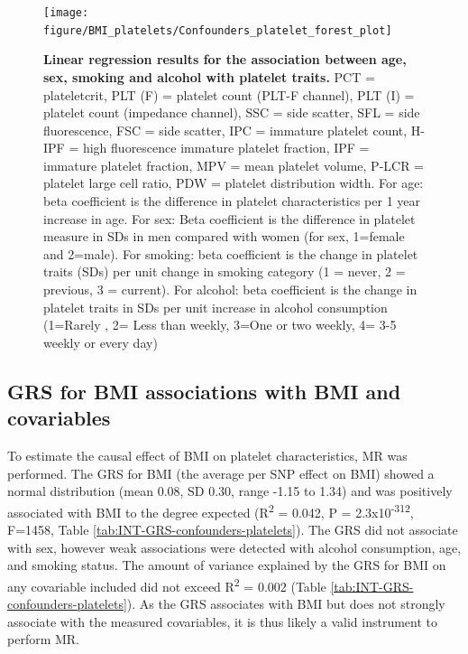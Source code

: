 \documentclass[11pt,twoside]{bristolthesis}
\begin{document}
\begin{figure}

{\centering \texttt{[image: figure/BMI\_platelets/Confounders\_platelet\_forest\_plot]} 

}

\caption[Linear regression results for the association between age, sex, smoking and alcohol with platelet traits]{\textbf{Linear regression results for the association between age, sex, smoking and alcohol with platelet traits.} PCT = plateletcrit, PLT (F) = platelet count (PLT-F channel), PLT (I) = platelet count (impedance channel), SSC = side scatter, SFL = side fluorescence, FSC = side scatter, IPC = immature platelet count, H-IPF = high fluorescence immature platelet fraction, IPF = immature platelet fraction, MPV = mean platelet volume, P-LCR = platelet large cell ratio, PDW = platelet distribution width. For age: beta coefficient is the difference in platelet characteristics per 1 year increase in age. For sex: Beta coefficient is the difference in platelet measure in SDs in men compared with women (for sex, 1=female and 2=male). For smoking: beta coefficient is the change in platelet traits (SDs) per unit change in smoking category (1 = never, 2 = previous, 3 = current). For alcohol: beta coefficient is the change in platelet traits in SDs per unit increase in alcohol consumption (1=Rarely , 2= Less than weekly, 3=One or two weekly, 4= 3-5 weekly or every day)}\label{fig:confounder-platelets}
\end{figure}
\hypertarget{grs-for-bmi-associations-with-bmi-and-covariables}{%
\subsection{GRS for BMI associations with BMI and covariables}\label{grs-for-bmi-associations-with-bmi-and-covariables}}

To estimate the causal effect of BMI on platelet characteristics, MR was performed. The GRS for BMI (the average per SNP effect on BMI) showed a normal distribution (mean 0.08, SD 0.30, range -1.15 to 1.34) and was positively associated with BMI to the degree expected (R\textsuperscript{2} = 0.042, P = 2.3x10\textsuperscript{-312}, F=1458, Table \ref{tab:INT-GRS-confounders-platelets}). The GRS did not associate with sex, however weak associations were detected with alcohol consumption, age, and smoking status. The amount of variance explained by the GRS for BMI on any covariable included did not exceed R\textsuperscript{2} = 0.002 (Table \ref{tab:INT-GRS-confounders-platelets}). As the GRS associates with BMI but does not strongly associate with the measured covariables, it is thus likely a valid instrument to perform MR.
\end{document}
